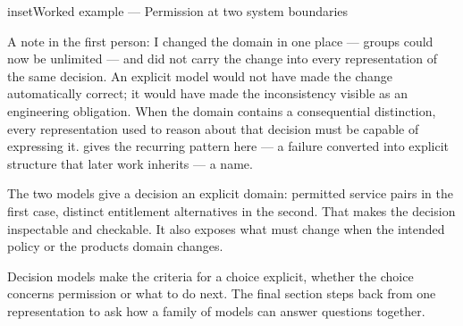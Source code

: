 \begin{bookbox}{inset}{Worked example --- Permission at two system boundaries}

A note in the first person: I changed the domain in one place --- groups could now be unlimited --- and did not carry the change into every representation of the same decision. An explicit model would not have made the change automatically correct; it would have made the inconsistency visible as an engineering obligation. When the domain contains a consequential distinction, every representation used to reason about that decision must be capable of expressing it.  gives the recurring pattern here --- a failure converted into explicit structure that later work inherits --- a name.

The two models give a decision an explicit domain: permitted service pairs in the first case, distinct entitlement alternatives in the second. That makes the decision inspectable and checkable. It also exposes what must change when the intended policy or the product\textquotesingle s domain changes.
\end{bookbox}

Decision models make the criteria for a choice explicit, whether the choice concerns permission or what to do next. The final section steps back from one representation to ask how a family of models can answer questions together.
